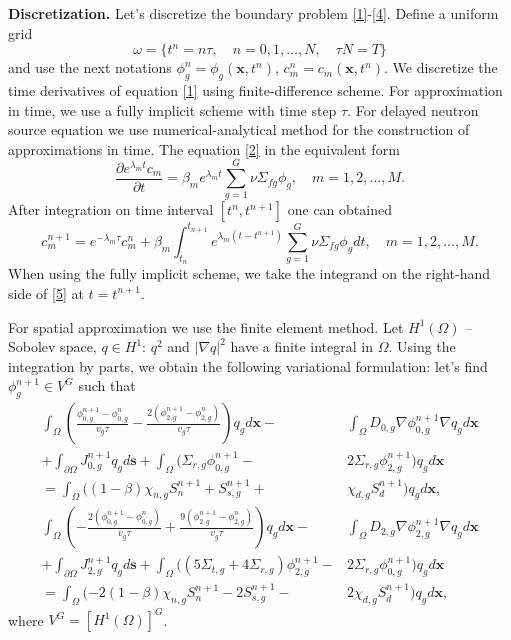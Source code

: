 \documentclass[authoryear]{elsarticle}
\begin{document}
\textbf{Discretization.}
Let's discretize the boundary problem \eqref{1}-\eqref{4}.
Define a uniform grid
\[
	\omega = \{ t^n=n \tau, \quad n = 0,1,\dots,N, \quad \tau N = T \}
\]
and use the next notations $\phi^n_g = \phi_g(\bm{x}, t^n)$, $c^n_m = c_m(\bm{x}, t^n)$. 
We discretize the time derivatives of equation \eqref{1} using finite-difference scheme. 
For approximation in time, we use a fully implicit scheme with time step $\tau$.
For delayed neutron source equation we use numerical-analytical method for the construction of approximations in time.
The equation \eqref{2} in the equivalent form
\[
	\frac{\partial e^{\lambda_m t} c_m}{\partial t} = 
	\beta_m e^{\lambda_m t} \sum_{g=1}^{G} \nu \Sigma_{fg} \phi_g, \quad m = 1,2,\dots,M.
\]
After integration on time interval $[t^n, t^{n+1}]$ one can obtained
\begin{equation}\label{5}
	c_m^{n+1} = e^{-\lambda_m\tau} c_m^n + 
	\beta_m \int_{t_n}^{t_{n+1}} e^{\lambda_m (t - t^{n+1})} \sum_{g=1}^{G} \nu \Sigma_{fg} \phi_g d t,
	\quad m = 1,2,\dots,M.
\end{equation}
When using the fully implicit scheme, we take the integrand on the right-hand side of \eqref{5} at $t = t^{n + 1}$.

For spatial approximation we use the finite element method.
Let $H^1(\Omega)$ -- Sobolev space, $q \in H^1$: $q^2$ and $\vert\nabla q\vert^2$ have a finite integral in $\Omega$. 
Using the integration by parts, we obtain the following variational formulation: let's find $\phi^{n+1}_g \in V^G$ such that
\begin{equation}\label{6}
\begin{split}
	\int_{\Omega} 
		\left( 
			\frac{\phi^{n+1}_{0,g} - \phi^{n}_{0,g}}{v_g \tau} -
			\frac{2(\phi^{n+1}_{2,g} - \phi^{n}_{2,g})}{v_g \tau} 
		\right) q_g d\bm{x} - & %
	\int_{\Omega} D_{0,g} \nabla \phi^{n+1}_{0,g} \nabla q_g d\bm{x} \\
	+ \int_{\partial\Omega} J^{n+1}_{0,g} q_g d\bm{s} +
	\int_{\Omega}
		(
			\Sigma_{r,g} \phi^{n+1}_{0,g} - & %
			2\Sigma_{r,g} \phi^{n+1}_{2,g} 
		) q_g d\bm{x} \\
	= \int_{\Omega} 
		(
			(1 - \beta) \chi_{n,g} S^{n+1}_{n} + 
			 S^{n+1}_{s,g} + & %
			 \chi_{d,g} S^{n+1}_d 
		) q_g d\bm{x}, \\
	\int_{\Omega} 
		\left( 
			- \frac{2(\phi^{n+1}_{0,g} - \phi^{n}_{0,g})}{v_g \tau} + 
			\frac{9(\phi^{n+1}_{2,g} - \phi^{n}_{2,g})}{v_g \tau} 
		\right) q_g d\bm{x} - & %
	\int_{\Omega} D_{2,g} \nabla \phi^{n+1}_{2,g} \nabla  q_g d\bm{x} \\
	+ \int_{\partial\Omega} J^{n+1}_{2,g} q_g d\bm{s} + 
	\int_{\Omega} 
		( 
			(5 \Sigma_{t,g} + 
			4 \Sigma_{r,g}) \phi^{n+1}_{2,g} - & %
			2\Sigma_{r,g} \phi^{n+1}_{0,g} 
		) q_g d\bm{x} \\
	= \int_{\Omega}
		( 
			- 2(1 - \beta) \chi_{n,g} S^{n+1}_{n} - 
			2S^{n+1}_{s,g} - & %
			2\chi_{d,g} S^{n+1}_d 
		) q_g d\bm{x},
\end{split}
\end{equation}
where $V^G=[H^1(\Omega)]^G$.
\end{document}
